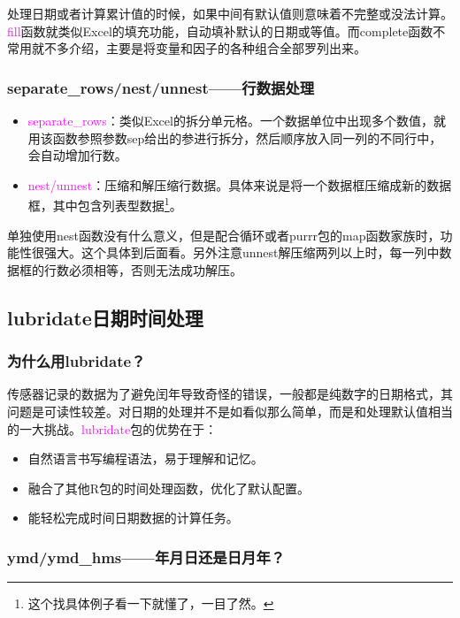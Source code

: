 \documentclass[cn,hazy,blue,14pt,screen]{elegantnote}
\begin{document}
处理日期或者计算累计值的时候，如果中间有默认值则意味着不完整或没法计算。\textcolor{magenta}{fill}函数就类似Excel的填充功能，自动填补默认的日期或等值。而complete函数不常用就不多介绍，主要是将变量和因子的各种组合全部罗列出来。

\subsubsection{separate\_rows/nest/unnest——行数据处理}

\begin{itemize}
  \item \textcolor{magenta}{separate\_rows}：类似Excel的拆分单元格。一个数据单位中出现多个数值，就用该函数参照参数sep给出的参进行拆分，然后顺序放入同一列的不同行中，会自动增加行数。
  \item \textcolor{magenta}{nest/unnest}：压缩和解压缩行数据。具体来说是将一个数据框压缩成新的数据框，其中包含列表型数据\footnote{这个找具体例子看一下就懂了，一目了然。}。
\end{itemize}

单独使用nest函数没有什么意义，但是配合循环或者purrr包的map函数家族时，功能性很强大。这个具体到后面看。另外注意unnest解压缩两列以上时，每一列中数据框的行数必须相等，否则无法成功解压。

\subsection{lubridate日期时间处理}

\subsubsection{为什么用lubridate？}

传感器记录的数据为了避免闰年导致奇怪的错误，一般都是纯数字的日期格式，其问题是可读性较差。对日期的处理并不是如看似那么简单，而是和处理默认值相当的一大挑战。\textcolor{magenta}{lubridate}包的优势在于：

\begin{itemize}
  \item 自然语言书写编程语法，易于理解和记忆。
  \item 融合了其他R包的时间处理函数，优化了默认配置。
  \item 能轻松完成时间日期数据的计算任务。
\end{itemize}

\subsubsection{ymd/ymd\_hms——年月日还是日月年？}
\end{document}
